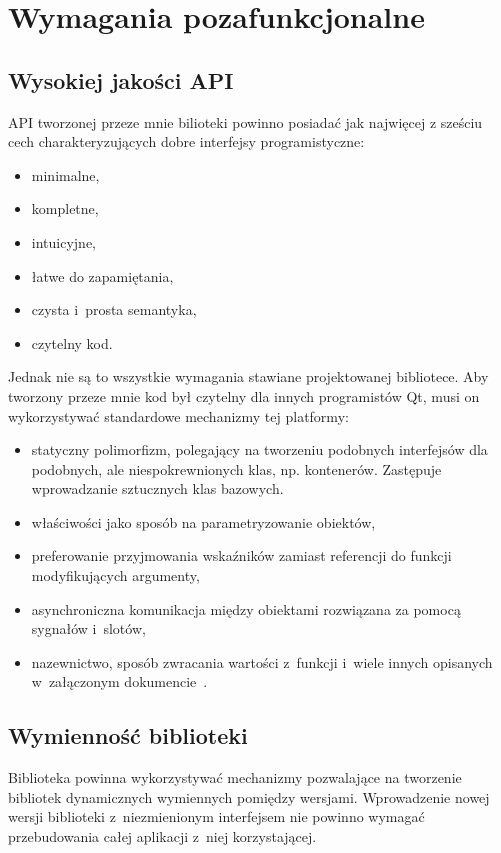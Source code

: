 \section{Wymagania pozafunkcjonalne}
\subsection{Wysokiej jakości API}
API tworzonej przeze mnie bilioteki powinno posiadać jak najwięcej z sześciu cech charakteryzujących dobre interfejsy programistyczne:
\begin{itemize}
\item{minimalne,}
\item{kompletne,}
\item{intuicyjne,} 
\item{łatwe do zapamiętania,}
\item{czysta i~prosta semantyka,}
\item{czytelny kod.}
\end{itemize}

Jednak nie są to wszystkie wymagania stawiane projektowanej bibliotece. Aby tworzony przeze mnie kod był czytelny dla innych programistów Qt, musi on wykorzystywać standardowe mechanizmy tej platformy:
\begin{itemize}
\item{statyczny polimorfizm, polegający na tworzeniu podobnych interfejsów dla podobnych, ale niespokrewnionych klas, np. kontenerów. Zastępuje wprowadzanie sztucznych klas bazowych.}
\item{właściwości jako sposób na parametryzowanie obiektów,}
\item{preferowanie przyjmowania wskaźników zamiast referencji do funkcji modyfikujących argumenty,}
\item{asynchroniczna komunikacja między obiektami rozwiązana za pomocą sygnałów i~slotów,}
\item{nazewnictwo, sposób zwracania wartości z~funkcji i~wiele innych opisanych w~załączonym dokumencie~\cite{APIDesign}.}
\end{itemize}

\subsection{Wymienność biblioteki}
Biblioteka powinna wykorzystywać mechanizmy pozwalające na tworzenie bibliotek dynamicznych wymiennych pomiędzy wersjami. Wprowadzenie nowej wersji biblioteki z~niezmienionym interfejsem nie powinno wymagać przebudowania całej aplikacji z~niej korzystającej.

